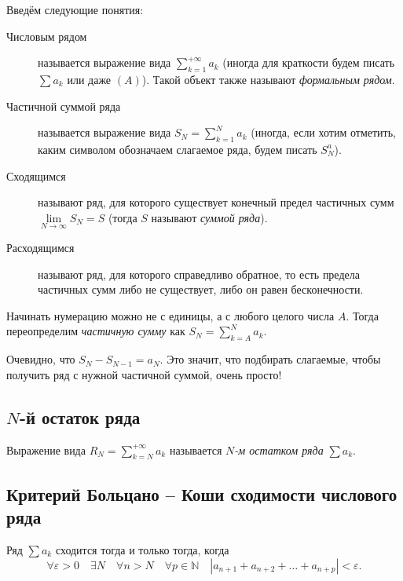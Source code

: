 \begin{definition}
	Введём следующие понятия:
	\begin{description}
		\item[Числовым рядом] называется выражение вида \(\sum\limits_{k=1}^{+\infty} a_k\) (иногда для краткости будем писать \(\sum a_k\) или даже \((A)\)). Такой объект также называют \textit{формальным рядом}.
		\item[Частичной суммой ряда] называется выражение вида \(S_N = \sum\limits_{k=1}^{N} a_k\) (иногда, если хотим отметить, каким символом обозначаем слагаемое ряда, будем писать \(S_N^a\)).
		\item[Сходящимся] называют ряд, для которого существует конечный предел частичных сумм \(\lim\limits_{N \to \infty} S_N = S\) (тогда \(S\) называют \textit{суммой ряда}).
		\item[Расходящимся] называют ряд, для которого справедливо обратное, то есть предела частичных сумм либо не существует, либо он равен бесконечности.
	\end{description}
\end{definition}

\begin{remark}
	Начинать нумерацию можно не с единицы, а с любого целого числа \(A\). Тогда переопределим \textit{частичную сумму} как \(S_N = \sum\limits_{k=A}^{N} a_k\).
\end{remark}

\begin{remark}
	Очевидно, что \(S_N - S_{N-1} = a_N\). Это значит, что подбирать слагаемые, чтобы получить ряд с нужной частичной суммой, очень просто!
\end{remark}

\subsection{\(N\)-й остаток ряда}

\begin{definition}
	Выражение вида \(R_N = \sum\limits_{k=N}^{+\infty} a_k\) называется \textit{\(N\)-м остатком ряда} \(\sum a_k\).
\end{definition}

\subsection{Критерий Больцано -- Коши сходимости числового ряда}

\begin{theorem}
	Ряд \(\sum a_k\) сходится тогда и только тогда, когда \[
	\forall \varepsilon > 0 \quad \exists N \quad \forall n > N \quad \forall p \in \mathbb{N} \quad |a_{n+1} + a_{n+2} + \ldots + a_{n+p}| < \varepsilon.
	\]
\end{theorem}